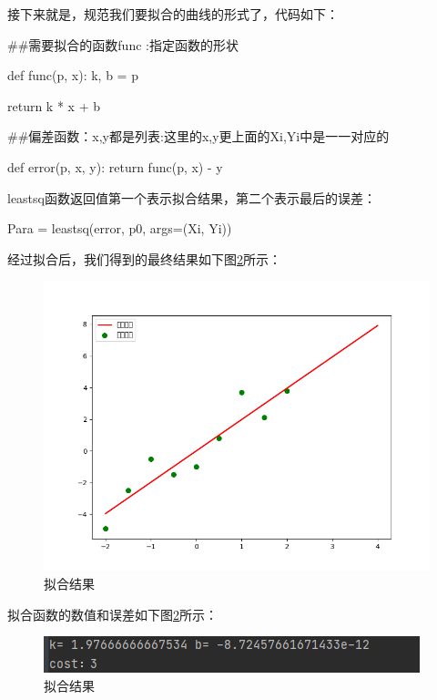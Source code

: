 \documentclass[UTF8,a4paper,10pt]{ctexart}
\begin{document}
接下来就是，规范我们要拟合的曲线的形式了，代码如下：

\begin{python}
   ##需要拟合的函数func :指定函数的形状

def func(p, x):
    k, b = p

    return k * x + b


##偏差函数：x,y都是列表:这里的x,y更上面的Xi,Yi中是一一对应的

def error(p, x, y):
    return func(p, x) - y

\end{python}

leastsq函数返回值第一个表示拟合结果，第二个表示最后的误差：

\begin{python}
   Para = leastsq(error, p0, args=(Xi, Yi))
\end{python}

经过拟合后，我们得到的最终结果如下图\ref{fig:1}所示：

\begin{figure}[H]
    \centering
    \includegraphics[scale=0.5]{2.png}
    \caption{拟合结果}
    \label{fig:1}
\end{figure}

拟合函数的数值和误差如下图\ref{fig:1}所示：

\begin{figure}[H]
    \centering
    \includegraphics[scale=1]{3.png}
    \caption{拟合结果}
    \label{fig:1}
\end{figure}
\end{document}
